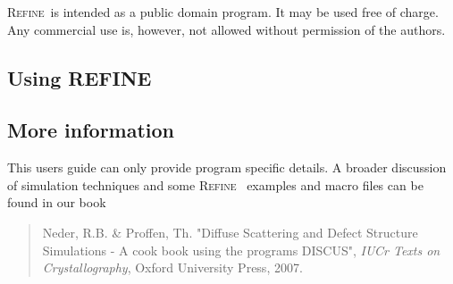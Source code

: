 \documentclass[11pt]{report}
\newcommand{\Diffev}{\textsc{Diffev\ }}
\newcommand{\Refine}{\textsc{Refine\ }}
\begin{document}
\Refine is intended as a public domain program. It may be used free
of charge.  Any commercial use is, however, not allowed without permission
of the authors.


\subsection*{Using REFINE}



\subsection*{More information}

This users guide can only provide program specific details. A
broader discussion of simulation techniques and some \Refine
examples and macro files can be found in our book

\begin{quote}
  {\sc Neder, R.B. \& Proffen, Th.} "Diffuse Scattering and Defect Structure
  Simulations - A cook book using the programs DISCUS", {\it IUCr Texts on
  Crystallography}, Oxford University Press, 2007.
\end{quote}


\tableofcontents

%
%







\appendix





\end{document}
